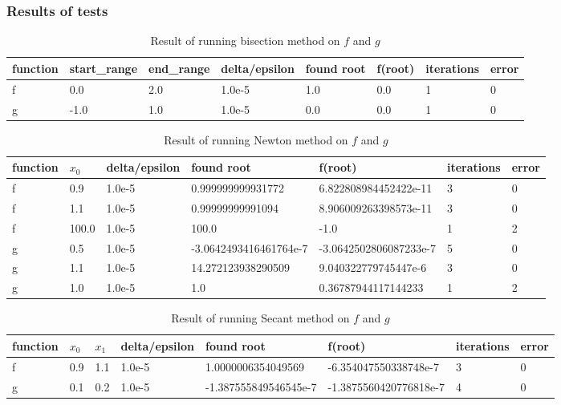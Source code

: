 \documentclass[11pt]{article}
\begin{document}
\subsubsection{Results of tests}
\begin{table}[!ht]
    \centering
    \begin{tabular}{|l|l|l|l|l|l|l|l|}
    \hline
        function & start\_range & end\_range & delta/epsilon & found root & f(root) & iterations & error \\ \hline
        f & 0.0 & 2.0 & 1.0e-5 & 1.0 & 0.0 & 1 & 0 \\ \hline
        g & -1.0 & 1.0 & 1.0e-5 & 0.0 & 0.0 & 1 & 0 \\ \hline
    \end{tabular}
    \caption{Result of running bisection method on $f$ and $g$}
\end{table}
\begin{table}[!ht]
    \centering
    \begin{tabular}{|l|l|l|l|l|l|l|}
    \hline
        function & $x_0$ & delta/epsilon & found root & f(root) & iterations & error \\ \hline
        f & 0.9 & 1.0e-5 & 0.999999999931772 & 6.822808984452422e-11 & 3 & 0 \\ \hline
        f & 1.1 & 1.0e-5 & 0.99999999991094 & 8.906009263398573e-11 & 3 & 0 \\ \hline
        f & 100.0 & 1.0e-5 & 100.0 & -1.0 & 1 & 2 \\ \hline
        g & 0.5 & 1.0e-5 & -3.0642493416461764e-7 & -3.0642502806087233e-7 & 5 & 0 \\ \hline
        g & 1.1 & 1.0e-5 & 14.272123938290509 & 9.040322779745447e-6 & 3 & 0 \\ \hline
        g & 1.0 & 1.0e-5 & 1.0 & 0.36787944117144233 & 1 & 2 \\ \hline
    \end{tabular}
    \caption{Result of running Newton method on $f$ and $g$}
\end{table}
\begin{table}[!ht]
    \centering
    \begin{tabular}{|l|l|l|l|l|l|l|l|}
    \hline
        function & $x_0$ & $x_1$ & delta/epsilon & found root & f(root) & iterations & error \\ \hline
        f & 0.9 & 1.1 & 1.0e-5 & 1.0000006354049569 & -6.354047550338748e-7 & 3 & 0 \\ \hline
        g & 0.1 & 0.2 & 1.0e-5 & -1.387555849546545e-7 & -1.3875560420776818e-7 & 4 & 0 \\ \hline
    \end{tabular}
    \caption{Result of running Secant method on $f$ and $g$}
\end{table}
\end{document}
